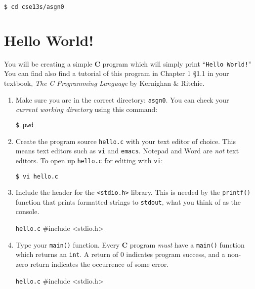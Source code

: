 \documentclass[11pt]{article}
\begin{document}
\begin{lstlisting}[style=bashstyle]
  $ cd cse13s/asgn0
\end{lstlisting}

\section{Hello World!}

You will be creating a simple \textbf{C} program which will simply print
``\texttt{Hello World!}'' You can find also find a tutorial of this program in
Chapter 1 \S 1.1 in your textbook, \textit{The C Programming Language} by
Kernighan \& Ritchie.

\begin{enumerate}
  \item Make sure you are in the correct directory: \texttt{asgn0}. You can
    check your \emph{current working directory} using this command:

\begin{lstlisting}[style=bashstyle]
  $ pwd
\end{lstlisting}

  \item Create the program source \texttt{hello.c} with your text editor of
    choice. This means text editors such as \texttt{vi} and \texttt{emacs}.
    Notepad and Word are \emph{not} text editors. To open up \texttt{hello.c}
    for editing with \texttt{vi}:

\begin{lstlisting}[style=bashstyle]
  $ vi hello.c
\end{lstlisting}

  \item Include the header for the \texttt{<stdio.h>} library. This is needed by
    the \texttt{printf()} function that prints formatted strings to
    \texttt{stdout}, what you think of as the console.

\begin{codelisting}{\texttt{hello.c}}
#include <stdio.h>
\end{codelisting}

  \item Type your \texttt{main()} function. Every \textbf{C} program \emph{must}
    have a \texttt{main()} function which returns an \texttt{int}. A return of 0
    indicates program success, and a non-zero return indicates the occurrence of
    some error.

\begin{codelisting}{\texttt{hello.c}}
#include <stdio.h>


\end{codelisting}
\end{enumerate}
\end{document}
